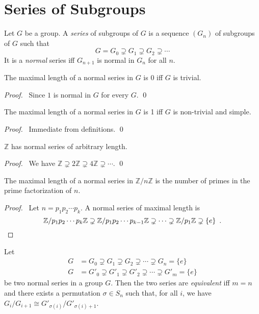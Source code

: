 \section{Series of Subgroups}

\begin{df}
Let $G$ be a group. A \emph{series} of subgroups of $G$ is a sequence $(G_n)$ of subgroups of $G$ such that
\[ G = G_0 \supsetneq G_1 \supsetneq G_2 \supsetneq \cdots \]
It is a \emph{normal} series iff $G_{n+1}$ is normal in $G_n$ for all $n$.
\end{df}

\begin{prop}
The maximal length of a normal series in $G$ is 0 iff $G$ is trivial.
\end{prop}

\begin{proof}
\pf\ Since $1$ is normal in $G$ for every $G$. \qed
\end{proof}

\begin{prop}
The maximal length of a normal series in $G$ is 1 iff $G$ is non-trivial and simple.
\end{prop}

\begin{proof}
\pf\ Immediate from definitions. \qed
\end{proof}

\begin{ex}
$\mathbb{Z}$ has normal series of arbitrary length.
\end{ex}

\begin{proof}
\pf\ We have $\mathbb{Z} \supsetneq 2 \mathbb{Z} \supsetneq 4 \mathbb{Z} \supsetneq \cdots$. \qed
\end{proof}

\begin{ex}
The maximal length of a normal series in $\mathbb{Z} / n \mathbb{Z}$ is the number of primes in the prime factorization of $n$.
\end{ex}

\begin{proof}
\pf\ Let $n = p_1 p_2 \cdots p_k$. A normal series of maximal length is
\[ \mathbb{Z} / p_1 p_2 \cdots p_k \mathbb{Z} \supsetneq \mathbb{Z} / p_1 p_2 \cdots p_{k-1} \mathbb{Z} \supsetneq \cdots \supsetneq \mathbb{Z} / p_1 \mathbb{Z} \supsetneq \{e\} \enspace . \qed \]
\end{proof}

\begin{df}
Let
\begin{align*}
G & = G_0 \supsetneq G_1 \supsetneq G_2 \supsetneq \cdots \supsetneq G_n = \{e\} \\
G & = G'_0 \supsetneq G'_1 \supsetneq G'_2 \supsetneq \cdots \supsetneq G'_m = \{e\}
\end{align*}
be two normal series in a group $G$. Then the two series are \emph{equivalent} iff $m = n$ and there exists a permutation $\sigma \in S_n$ such that, for all $i$, we have $G_i / G_{i+1} \cong G'_{\sigma(i)} / G'_{\sigma(i) + 1}$.
\end{df}

